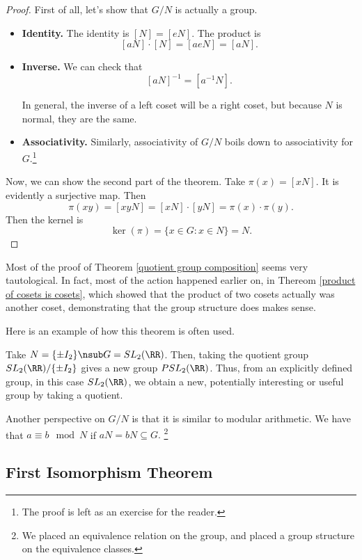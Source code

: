 \begin{proof}

First of all, let's show that $G/N$ is actually a group.
\begin{itemize}
    \item \textbf{Identity.} The identity is $[N] = [eN]$. The product is 
    \[
    [aN] \cdot [N] = [aeN] = [aN].
    \]
    
    \item \textbf{Inverse.} 
    We can check that
    \[
    [aN]^{-1} = [a^{-1}N].
    \]
    
    In general, the inverse of a left coset will be a right coset, but because $N$ is normal, they are the same.  
    
    \item \textbf{Associativity.} Similarly, associativity of $G/N$ boils down to associativity for $G.$\footnote{The proof is left as an exercise for the reader.}
\end{itemize}

Now, we can show the second part of the theorem. Take $\pi(x) = [xN]$. It is evidently a surjective map. Then 
\[
\pi(xy) = [xyN] = [xN] \cdot [yN] = \pi(x) \cdot \pi(y).
\]
Then the kernel is 
\[
\ker(\pi) = \{x \in G : x \in N\} = N.
\]

\end{proof}

Most of the proof of Theorem \ref{quotient group composition} seems very tautological. In fact, most of the action happened earlier on, in Thereom \ref{product of cosets is cosets}, which showed that the product of two cosets actually was another coset, demonstrating that the group structure does makes sense.

Here is an example of how this theorem is often used. 
\begin{example}
Take $N = \{\pm I_2\} \nsub G = SL_2(\RR)$. Then, taking the quotient group $SL_2(\RR) / \{\pm I_2\}$ gives a new group $PSL_2(\RR)$.  Thus, from an explicitly defined group, in this case $SL_2(\RR)$, we obtain a new, potentially interesting or useful group by taking a quotient.
\end{example}

Another perspective on $G/N$ is that it is similar to modular arithmetic. We have that $a \equiv b \mod N$ if $aN = bN \subseteq G.$ \footnote{We placed an equivalence relation on the group, and placed a group structure on the equivalence classes.}

\subsection{First Isomorphism Theorem}

